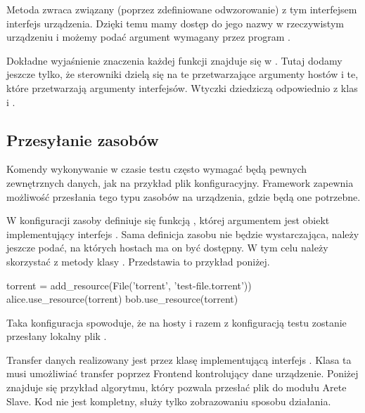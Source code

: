 \documentclass[00-praca-magisterska.tex]{subfiles}
\begin{document}
Metoda  zwraca związany (poprzez zdefiniowane
odwzorowanie) z tym interfejsem interfejs urządzenia. Dzięki temu mamy dostęp do
jego nazwy w rzeczywistym urządzeniu i możemy podać argument wymagany przez
program .

Dokładne wyjaśnienie znaczenia każdej funkcji znajduje się w . Tutaj dodamy jeszcze tylko, że sterowniki dzielą się na te
przetwarzające argumenty hostów i te, które przetwarzają argumenty interfejsów.
Wtyczki dziedziczą odpowiednio z klas  i
.

\subsection{Przesyłanie zasobów}

Komendy wykonywanie w czasie testu często wymagać będą pewnych zewnętrznych
danych, jak na przykład plik konfiguracyjny. Framework zapewnia możliwość
przesłania tego typu zasobów na urządzenia, gdzie będą one potrzebne.

W konfiguracji zasoby definiuje się funkcją , której
argumentem jest obiekt implementujący interfejs . Sama definicja
zasobu nie będzie wystarczająca, należy jeszcze podać, na których hostach ma on
być dostępny. W tym celu należy skorzystać z metody  klasy
. Przedstawia to przykład poniżej.

\begin{pythoncode}
  torrent = add_resource(File('torrent', 'test-file.torrent'))
  alice.use_resource(torrent)
  bob.use_resource(torrent)
\end{pythoncode}

Taka konfiguracja spowoduje, że na hosty  i  razem z
konfiguracją testu zostanie przesłany lokalny plik .

Transfer danych realizowany jest przez klasę implementującą interfejs
. Klasa ta musi umożliwiać transfer poprzez Frontend kontrolujący
dane urządzenie. Poniżej znajduje się przykład algorytmu, który pozwala przesłać
plik do modułu Arete Slave. Kod nie jest kompletny, służy tylko zobrazowaniu
sposobu działania.

\end{document}
